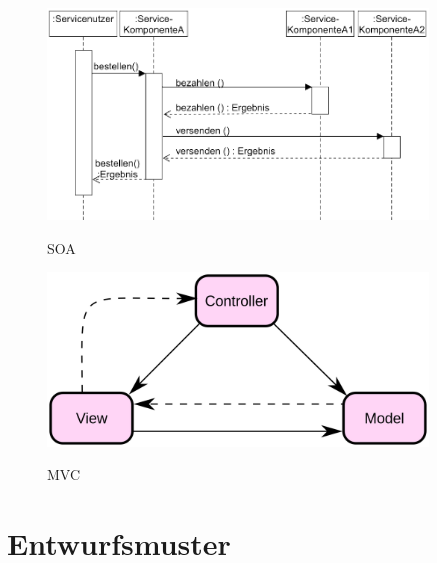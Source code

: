 \begin{figure}[htb]
    \centering
    \begin{minipage}[t]{0.45\linewidth}
		\centering
		\includegraphics[width=0.9\textwidth]{images/soa}
		\label{fig:soa}
		\caption{SOA}
	\end{minipage}%
	\hfill
    \begin{minipage}[t]{0.45\linewidth}
		\centering
		\includegraphics[width=0.9\textwidth]{images/mvc}
		\label{fig:mvc}
		\caption{MVC}
	\end{minipage}
\end{figure}


\section{Entwurfsmuster}


